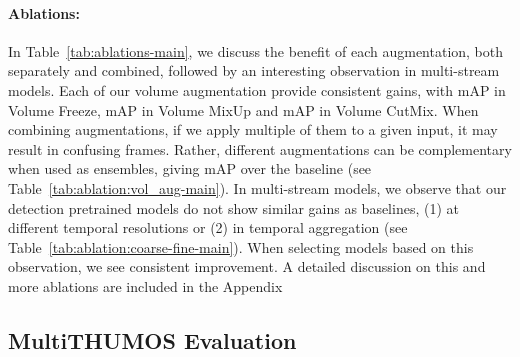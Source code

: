 \documentclass[letterpaper]{article} \usepackage{aaai23}  \usepackage{times}  \usepackage{helvet}  \usepackage{courier}  \usepackage[hyphens]{url}  \usepackage{graphicx} \urlstyle{rm} \def\UrlFont{\rm}  \usepackage{natbib}  \usepackage{caption} \frenchspacing  \setlength{\pdfpagewidth}{8.5in}  \setlength{\pdfpageheight}{11in}  \usepackage{algorithm}
\newcommand{\tref}[1]{Table~\ref{#1}}
\begin{document}
\paragraph{Ablations:} In \tref{tab:ablations-main}, we discuss the benefit of each augmentation, both separately and combined, followed by an interesting observation in multi-stream models. Each of our volume augmentation provide consistent gains, with  mAP in Volume Freeze,  mAP in Volume MixUp and  mAP in Volume CutMix. When combining augmentations, if we apply multiple of them to a given input, it may result in confusing frames. Rather, different augmentations can be complementary when used as ensembles, giving  mAP over the baseline (see \tref{tab:ablation:vol_aug-main}). In multi-stream models, we observe that our detection pretrained models do not show similar gains as baselines, (1) at different temporal resolutions or (2) in temporal aggregation (see \tref{tab:ablation:coarse-fine-main}). When selecting models based on this observation, we see consistent improvement. A detailed discussion on this and more ablations are included in the Appendix

\subsection{MultiTHUMOS Evaluation}
\label{subsec:multithumos}
\end{document}
